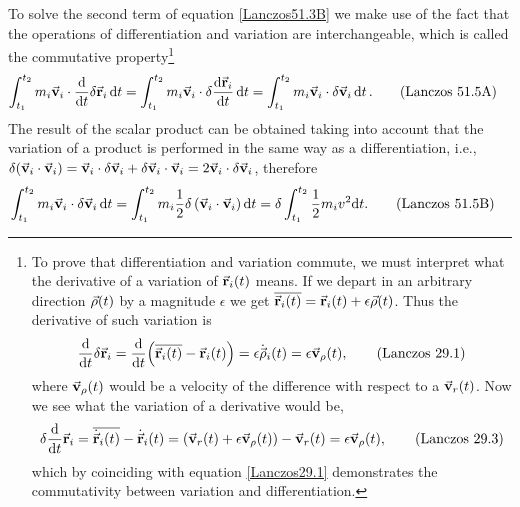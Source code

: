 \documentclass[12pt, spanish, a4paper, ]{article}
\begin{document}
To solve the second term of equation \eqref{Lanczos51.3B} we make use of the fact that the operations of differentiation and variation are interchangeable, which is called the commutative property\footnote{
To prove that differentiation and variation commute, we must interpret what the derivative of a variation of \(\va{r}_i (t)\) means.
If we depart in an arbitrary direction \(\va{\rho} (t)\) by a magnitude \(\epsilon\) we get \(\overline{\va{r}_i (t)}= \va{r}_i (t)+ \epsilon \va{\rho} (t)\).
Thus the derivative of such variation is
\begin{equation}\label{Lanczos29.1}
	\dv{t} \delta \va{r}_i= \dv{t}\pqty{\overline{\va{r}_i (t)}- \va{r}_i (t)}= \epsilon \dot{\va{\rho}}_i (t)= \epsilon \va{v}_\rho (t),
	\tag{Lanczos 29.1}
\end{equation}
where \(\va{v}_\rho (t) \) would be a velocity of the difference with respect to a \(\va{v}_r (t) \).
Now we see what the variation of a derivative would be,
\begin{equation}\label{Lanczos29.3}
	\delta \dv{t} \va{r}_i= \overline{\dot{\va{r}}_i (t)} - \dot{\va{r}}_i (t)= \pqty{\va{v}_r (t) + \epsilon \va{v}_\rho (t)}- \va{v}_r (t) = \epsilon \va{v}_\rho (t),
	\tag{Lanczos 29.3}
\end{equation}
which by coinciding with equation \eqref{Lanczos29.1} demonstrates the commutativity between variation and differentiation.
}
\begin{align}\label{Lanczos51.5A}
	\int^{t_2}_{t_1} m_i \va{v}_i \cdot \dv{t} \delta \va{r}_i \dd{t} & =
	\int^{t_2}_{t_1} m_i \va{v}_i \cdot \delta \dv{\va{r}_i}{t} \dd{t} =
	\int^{t_2}_{t_1} m_i \va{v}_i \cdot \delta \va{v}_i \dd{t}. 
	\tag{Lanczos 51.5A}
\end{align}
The result of the scalar product can be obtained taking into account that the variation of a product is performed in the same way as a differentiation, i.e., \(\delta(\va{v}_i \cdot \va{v}_i)= \va{v}_i \cdot \delta \va{v}_i +\delta \va{v}_i \cdot \va{v}_i= 2 \va{v}_i \cdot \delta \va{v}_i\), therefore
\begin{align}\label{Lanczos51.5B}
	\int^{t_2}_{t_1} m_i \va{v}_i \cdot \delta \va{v}_i \dd{t} & =
	\int^{t_2}_{t_1} m_i \frac{1}{2} \delta \left( \va{v}_i \cdot \va{v}_i \right) \dd{t} = 
	\delta \int^{t_2}_{t_1} \frac{1}{2} m_i v^2 \dd t.
	\tag{Lanczos 51.5B}
\end{align}
\end{document}
